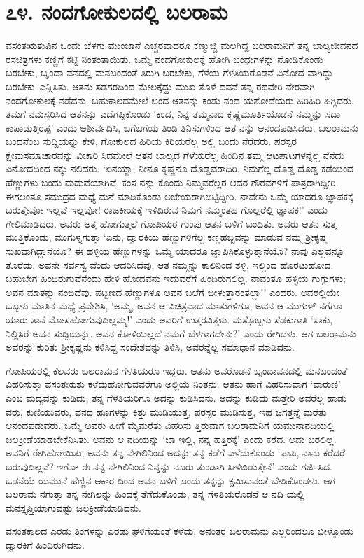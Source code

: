 
\chapter{೭೪. ನಂದಗೋಕುಲದಲ್ಲಿ ಬಲರಾಮ}

ವಸಂತಋತುವಿನ ಒಂದು ಬೆಳಗು ಮುಂಜಾನೆ ಎಚ್ಚರವಾದರೂ ಕಣ್ಮುಚ್ಚಿ ಮಲಗಿದ್ದ ಬಲರಾಮನಿಗೆ ತನ್ನ ಬಾಲ್ಯಜೀವನದ ರಸಚಿತ್ರಗಳು ಕಣ್ಣಿಗೆ ಕಟ್ಟಿ ನಿಂತಂತಾಯಿತು. ಒಮ್ಮೆ ನಂದಗೋಕುಲಕ್ಕೆ ಹೋಗಿ ಬಂಧುಗಳನ್ನು ನೋಡಿಕೊಂಡು ಬರಬೇಕು, ಬೃಂದಾ ವನದಲ್ಲಿ ಮನಬಂದಂತೆ ತಿರುಗಿ ಬರಬೇಕು, ಗೆಳೆಯ ಗೆಳತಿಯರೊಡನೆ ವಿನೋದ ವಾಗಿದ್ದು ಬರಬೇಕು–ಎನ್ನಿಸಿತು. ಆತನು ಸಡಗರದಿಂದ ಮೇಲಕ್ಕೆದ್ದು ಮುಖ ತೊಳೆ ದವನೆ ತನ್ನ ರಥವೇರಿ ನೇರವಾಗಿ ನಂದಗೋಕುಲಕ್ಕೆ ನಡೆದನು. ಬಹುಕಾಲದಮೇಲೆ ಬಂದ ಆತನನ್ನು ಕಂಡು ನಂದ ಯಶೋದೆಯರು ಹಿರಿಹಿರಿ ಹಿಗ್ಗಿದರು. ತಮಗೆ ನಮಸ್ಕರಿಸಿದ ಆತನನ್ನು ಎದೆಗಪ್ಪಿಕೊಂಡು ‘ಕಂದ, ನಿನ್ನ ತಮ್ಮನಾದ ಕೃಷ್ಣಮೂರ್ತಿಯೊಡನೆ ನಮ್ಮನ್ನು ಸದಾ ಕಾಪಾಡುತ್ತಿರಪ್ಪ’ ಎಂದು ಆಶೀರ್ವದಿಸಿ, ಬಗೆಬಗೆಯ ತಿಂಡಿ ತಿನಿಸುಗಳಿಂದ ಆತ ನನ್ನು ಆನಂದಪಡಿಸಿದರು. ಬಲರಾಮನು ಬಂದನೆಂಬ ಸುದ್ದಿಯನ್ನು ಕೇಳಿ, ಗೋಕುಲದ ಹಿರಿಯ ಕಿರಿಯರೆಲ್ಲ ಅಲ್ಲಿ ಬಂದು ನೆರೆದರು. ಪರಸ್ಪರ ಕ್ಷೇಮಸಮಾಚಾರವನ್ನು ವಿಚಾರಿ ಸಿದಮೇಲೆ ಆತನ ಬಾಲ್ಯದ ಗೆಳೆಯರೆಲ್ಲ ಹಿಂದಿನ ತಮ್ಮ ಆಟಪಾಟಗಳನ್ನೆಲ್ಲ ನೆನೆದು ವಿನೋದದಿಂದ ನಕ್ಕು ನಲಿದರು. ‘ಏನಯ್ಯಾ, ನೀನೂ ಕೃಷ್ಣನೂ ದೊಡ್ಡವರಾದಿರಿ, ನಿಮಗೆಲ್ಲ ದೊಡ್ಡ ದೊಡ್ಡ ಕಡೆಯಿಂದ ಹೆಣ್ಣುಗಳು ಬಂದು ಮದುವೆಯಾಗಿವೆ. ಕಂಸ ನನ್ನು ಕೊಂದು ನಿಮ್ಮವರೆಲ್ಲರ ಆದರ ಗೌರವಗಳಿಗೆ ಪಾತ್ರರಾಗಿದ್ದೀರಿ. ಈಗಲಂತೂ ಸಮುದ್ರದ ಮಧ್ಯೆ ಮನೆ ಮಾಡಿಕೊಂಡು ಅಜೇಯರಾಗಿಬಿಟ್ಟಿದ್ದೀರಿ. ನಾವೇನು ಒಮ್ಮೆ ಯಾದರೂ ಜ್ಞಾಪಕಕ್ಕೆ ಬರುತ್ತೇವೋ ಇಲ್ಲವೆ ಇಲ್ಲವೋ! ರಾಜಕೀಯಕ್ಕೆ ಇಳಿದಿರುವ ನಿಮಗೆ ನಮ್ಮಂತಹ ಗೊಲ್ಲರೆಲ್ಲಿ ಜ್ಞಾಪಕ!’ ಎಂದು ಗೇಲಿಮಾಡಿದರು. ಅವರು ಅತ್ತ ಹೋಗುತ್ತಲೆ ಗೋಪಿಯರ ಗುಂಪು ಆತನ ಬಳಿಗೆ ಬಂದಿತು. ಅವರು ಆತನ ಸುತ್ತ ಮುತ್ತಿಕೊಂಡು, ಮುಗುಳ್ನಗುತ್ತಾ ‘ಏನು, ದ್ವಾರಕಿಯ ಹೆಣ್ಣುಗಳಿಗೆಲ್ಲ ಕಣ್ಣಹಬ್ಬವನ್ನು ಮಾಡುವ ನಮ್ಮ ಶ್ರೀಕೃಷ್ಣ ಸುಖವಾಗಿದ್ದಾನೆಯೊ? ಈ ಹಳ್ಳಿಯ ಹೆಣ್ಣುಗಳನ್ನು ಒಮ್ಮೆ ಯಾದರೂ ಜ್ಞಾಪಿಸಿಕೊಳ್ಳುತ್ತಾನೆಯೊ? ನಾವು ಎಲ್ಲವನ್ನೂ ತೊರೆದು, ಅವನೇ ಸರ್ವಸ್ವ ವೆಂದು ಆದರಿಸಿದೆವು; ಆತ ನಮ್ಮನ್ನು ಕಾಲಿನಿಂದ ತಳ್ಳಿ, ಇಲ್ಲಿಂದ ಹೊರಟುಹೋದ. ಬಹುಬೇಗ ಹಿಂದಿರುಗುವೆನೆಂದು ಹೇಳಿ ಹೋದವನು ಇದುವರೆಗೆ ಹಿಂದಿರುಗಲಿಲ್ಲ. ನಾವಂತೂ ಹಳ್ಳಿಯ ಗುಗ್ಗುಗಳು; ಅವನ ಮಾತನ್ನು ನಂಬಿದೆವು. ಪಟ್ಟಣದ ಹೆಣ್ಣುಗಳೂ ಅವನ ಬಲೆಗೆ ಬೀಳುತ್ತಾರಂತಲ್ಲಾ!’ ಎಂದರು. ಅವರಲ್ಲಿಯೇ ಒಬ್ಬಳು ಮಾತಿನ ಮಧ್ಯೆ ಪ್ರವೇಶಿಸಿ, ‘ಅಮ್ಮ, ಅವನ ಆ ವಿಚಿತ್ರವಾದ ಮಾತುಗಳಿಗೂ, ಅವನ ಆ ಮುಗುಳ್ ನಗೆಗೂ ಯಾರು ತಾನೆ ಮೋಸಹೋಗುವುದಿಲ್ಲಮ್ಮ!’ ಎಂದು ಅವರಿಗೆ ಉತ್ತರವಿತ್ತಳು. ಮತ್ತೊಬ್ಬಳು ಸೆಡಕುಗಾತಿ ‘ಸಾಕು, ನಿಲ್ಲಿಸಿರೆ ಅವನ ಸುದ್ದಿಯನ್ನು. ಅವನ ಕೋಳಿಯಿಲ್ಲದೆ ನಮಗೆ ಬೆಳಗಾಗದೇನು?’ ಎಂದು ರೇಗಿದಳು. ಆಗ ಬಲರಾಮನು ಅವರನ್ನು ಕುರಿತು ಶ್ರೀಕೃಷ್ಣನು ಕಳಿಸಿದ್ದ ಸಂದೇಶವನ್ನು ತಿಳಿಸಿ, ಅವರನ್ನೆಲ್ಲ ಸಮಾಧಾನ ಮಾಡಿದನು.

ಗೋಪಿಯರಲ್ಲಿ ಕೆಲವರು ಬಲರಾಮನ ಗೆಳತಿಯರೂ ಇದ್ದರು. ಆತನು ಅವರೊಡನೆ ಬೃಂದಾವನದಲ್ಲಿ ಮನಬಂದಂತೆ ವಿಹರಿಸುತ್ತಾ ವಸಂತಋತು ಕಳೆದುಹೋಗುವವರೆಗೂ ಅಲ್ಲಿಯೆ ನಿಂತನು. ಆತನು ಹಾಗೆ ವಿಹರಿಸುವಾಗ ‘ವಾರುಣಿ’ ಎಂಬ ಮದ್ಯವನ್ನು ಕುಡಿದು, ತನ್ನ ಗೆಳತಿಯರಿಗೂ ಅದನ್ನು ಕುಡಿಸಿದನು. ಅದನ್ನು ಕುಡಿದು ಮತ್ತೇರಿ ಅವರೆಲ್ಲ ಹಾಡು ವರು, ಕುಣಿಯುವರು, ವನದ ಹೂಗಳನ್ನು ಕಿತ್ತು ಮುಡಿಯುತ್ತ, ಪರಸ್ಪರ ಮುಡಿಸುತ್ತ, ಇಹ ಜಗತ್ತನ್ನೆ ಮರೆತು ಆನಂದಪಡುವರು. ಒಮ್ಮೆ ಅವರು ಹೀಗೆ ಮೈಮರೆತು ವಿಹರಿಸು ತ್ತಿರುವಾಗ ಬಲರಾಮನಿಗೆ ಯಮುನಾನದಿಯಲ್ಲಿ ಜಲಕ್ರೀಡೆಯಾಡಬೇಕೆನಿಸಿತು. ಅವನು ಆ ನದಿಯನ್ನು ‘ಬಾ ಇಲ್ಲಿ, ನನ್ನ ಹತ್ತಿರಕ್ಕೆ’ ಎಂದು ಕರೆದ. ಅದು ಬರಲಿಲ್ಲ. ಅವನಿಗೆ ರೇಗಿಹೋಯಿತು, ಅವನು ತನ್ನ ನೇಗಿಲಿನಿಂದ ಅದನ್ನು ತನ್ನ ಕಡೆಗೆ ಎಳೆದುಕೊಂಡು ‘ಪಾಪಿ, ನಾನು ಕರೆದರೆ ಬರುವುದಿಲ್ಲವೆ? ಇಗೋ ಈ ನನ್ನ ನೇಗಿಲಿನಿಂದ ನಿನ್ನನ್ನು ನೂರು ತುಂಡಾಗಿ ಸೀಳಿಬಿಡುತ್ತೇನೆ’ ಎಂದು ಗರ್ಜಿಸಿದ. ಒಡನೆಯೆ ಯಮುನೆ ಹೆಣ್ಣಿನ ಆಕಾರ ದಿಂದ ಅವನ ಬಳಿಗೆ ಬಂದು ತನ್ನನ್ನು ಕ್ಷಮಿಸುವಂತೆ ಬೇಡಿಕೊಂಡಳು. ಆಗ ಬಲರಾಮ ನಗುತ್ತಾ ತನ್ನ ನೇಗಿಲನ್ನು ಹಿಂದಕ್ಕೆ ತೆಗೆದುಕೊಂಡು, ತನ್ನ ಗೆಳತಿಯರೊಡನೆ ಆ ನದಿ ಯಲ್ಲಿ ಮನಸ್ತೃಪ್ತಿಯಾಗುವಷ್ಟು ಜಲಕ್ರೀಡೆಯಾಡಿದನು.

ವಸಂತಕಾಲದ ಎರಡು ತಿಂಗಳನ್ನು ಎರಡು ಘಳಿಗೆಯಂತೆ ಕಳೆದು, ಅನಂತರ ಬಲರಾಮನು ಎಲ್ಲರಿಂದಲೂ ಬೀಳ್ಕೊಂಡು ದ್ವಾರಕಿಗೆ ಹಿಂದಿರುಗಿದನು.

